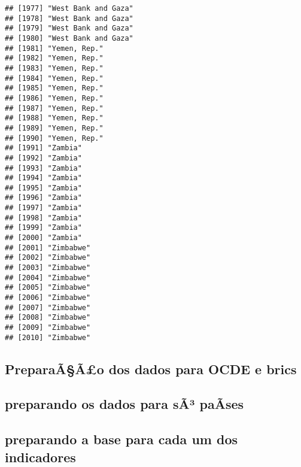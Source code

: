 \documentclass[]{article}
\begin{document}
\begin{verbatim}
## [1977] "West Bank and Gaza"                 
## [1978] "West Bank and Gaza"                 
## [1979] "West Bank and Gaza"                 
## [1980] "West Bank and Gaza"                 
## [1981] "Yemen, Rep."                        
## [1982] "Yemen, Rep."                        
## [1983] "Yemen, Rep."                        
## [1984] "Yemen, Rep."                        
## [1985] "Yemen, Rep."                        
## [1986] "Yemen, Rep."                        
## [1987] "Yemen, Rep."                        
## [1988] "Yemen, Rep."                        
## [1989] "Yemen, Rep."                        
## [1990] "Yemen, Rep."                        
## [1991] "Zambia"                             
## [1992] "Zambia"                             
## [1993] "Zambia"                             
## [1994] "Zambia"                             
## [1995] "Zambia"                             
## [1996] "Zambia"                             
## [1997] "Zambia"                             
## [1998] "Zambia"                             
## [1999] "Zambia"                             
## [2000] "Zambia"                             
## [2001] "Zimbabwe"                           
## [2002] "Zimbabwe"                           
## [2003] "Zimbabwe"                           
## [2004] "Zimbabwe"                           
## [2005] "Zimbabwe"                           
## [2006] "Zimbabwe"                           
## [2007] "Zimbabwe"                           
## [2008] "Zimbabwe"                           
## [2009] "Zimbabwe"                           
## [2010] "Zimbabwe"
\end{verbatim}

\hypertarget{preparaaao-dos-dados-para-ocde-e-brics}{%
\subsection{PreparaÃ§Ã£o dos dados para OCDE e
brics}\label{preparaaao-dos-dados-para-ocde-e-brics}}

\hypertarget{preparando-os-dados-para-sa-paases}{%
\subsection{preparando os dados para sÃ³
paÃ­ses}\label{preparando-os-dados-para-sa-paases}}

\hypertarget{preparando-a-base-para-cada-um-dos-indicadores}{%
\subsection{preparando a base para cada um dos
indicadores}\label{preparando-a-base-para-cada-um-dos-indicadores}}
\end{document}
